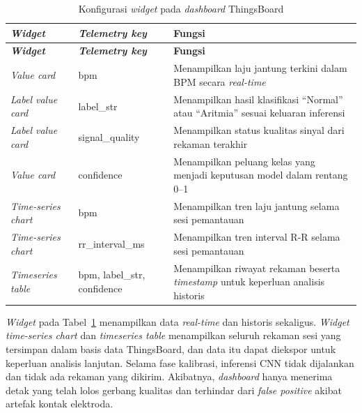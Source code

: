 \begin{center}
  \setlength{\tabcolsep}{4pt}
  \renewcommand{\arraystretch}{1.15}
  \small
  \begin{longtable}{p{4.0cm}p{3.1cm}p{6.0cm}}
    \caption{Konfigurasi \textit{widget} pada \textit{dashboard} ThingsBoard}
    \label{tab:widget-thingsboard} \\
    \toprule
    \textbf{\textit{Widget}} &
    \textbf{\textit{Telemetry key}} &
    \textbf{Fungsi} \\
    \midrule
    \endfirsthead
    \toprule
    \textbf{\textit{Widget}} &
    \textbf{\textit{Telemetry key}} &
    \textbf{Fungsi} \\
    \midrule
    \endhead
    \bottomrule
    \endfoot
    \textit{Value card} &
    bpm &
    Menampilkan laju jantung terkini dalam BPM secara \textit{real-time}\\
    \textit{Label value card} &
    label\_str &
    Menampilkan hasil klasifikasi ``Normal'' atau
    ``Aritmia'' sesuai keluaran inferensi \\
    \textit{Label value card} &
    signal\_quality &
    Menampilkan status kualitas sinyal dari rekaman terakhir \\
    \textit{Value card} &
    confidence &
    Menampilkan peluang kelas yang menjadi keputusan model dalam rentang 0--1 \\
    \textit{Time-series chart} &
    bpm &
    Menampilkan tren laju jantung selama sesi pemantauan \\
    \textit{Time-series chart} &
    rr\_interval\_ms &
    Menampilkan tren interval R-R selama sesi pemantauan \\
    \textit{Timeseries table} &
    bpm, label\_str, confidence &
    Menampilkan riwayat rekaman beserta \textit{timestamp} untuk
    keperluan analisis historis \\
  \end{longtable}
\end{center}

\textit{Widget} pada Tabel~\ref{tab:widget-thingsboard} menampilkan data
\textit{real-time} dan historis sekaligus. \textit{Widget} \textit{time-series chart}
dan \textit{timeseries table} menampilkan seluruh rekaman sesi yang tersimpan dalam basis data
ThingsBoard, dan data itu dapat diekspor untuk keperluan analisis
lanjutan. Selama fase kalibrasi, inferensi CNN tidak dijalankan dan
tidak ada rekaman yang dikirim. Akibatnya, \textit{dashboard} hanya menerima
detak yang telah lolos gerbang kualitas dan terhindar dari \textit{false
positive} akibat artefak kontak elektroda.

